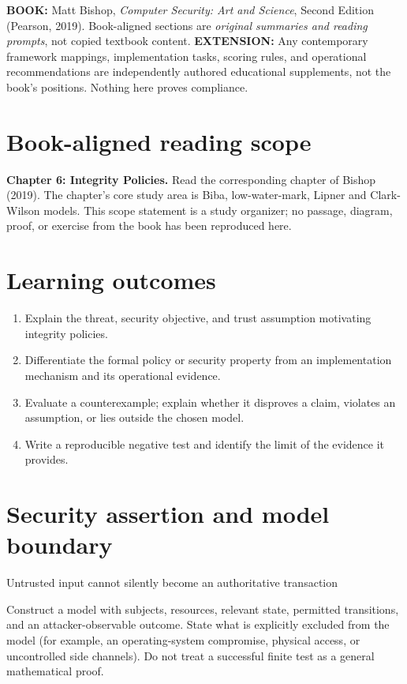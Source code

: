 \documentclass[10pt,letterpaper]{article}
\begin{document}
\makedoctocpage
\begin{notebox}
\textbf{BOOK:} Matt Bishop, \emph{Computer Security: Art and Science}, Second Edition (Pearson, 2019). Book-aligned sections are \emph{original summaries and reading prompts}, not copied textbook content.
\textbf{EXTENSION:} Any contemporary framework mappings, implementation tasks, scoring rules, and operational recommendations are independently authored educational supplements, not the book's positions. Nothing here proves compliance.
\end{notebox}
\section{Book-aligned reading scope}
\textbf{Chapter 6: Integrity Policies.} Read the corresponding chapter of Bishop (2019). The chapter's core study area is Biba, low-water-mark, Lipner and Clark-Wilson models. This scope statement is a study organizer; no passage, diagram, proof, or exercise from the book has been reproduced here.
\section{Learning outcomes}
\begin{enumerate}
\item Explain the threat, security objective, and trust assumption motivating integrity policies.
\item Differentiate the formal policy or security property from an implementation mechanism and its operational evidence.
\item Evaluate a counterexample; explain whether it disproves a claim, violates an assumption, or lies outside the chosen model.
\item Write a reproducible negative test and identify the limit of the evidence it provides.
\end{enumerate}
\section{Security assertion and model boundary}
\begin{infobox}
Untrusted input cannot silently become an authoritative transaction
\end{infobox}
Construct a model with subjects, resources, relevant state, permitted transitions, and an attacker-observable outcome. State what is explicitly excluded from the model (for example, an operating-system compromise, physical access, or uncontrolled side channels). Do not treat a successful finite test as a general mathematical proof.
\end{document}
